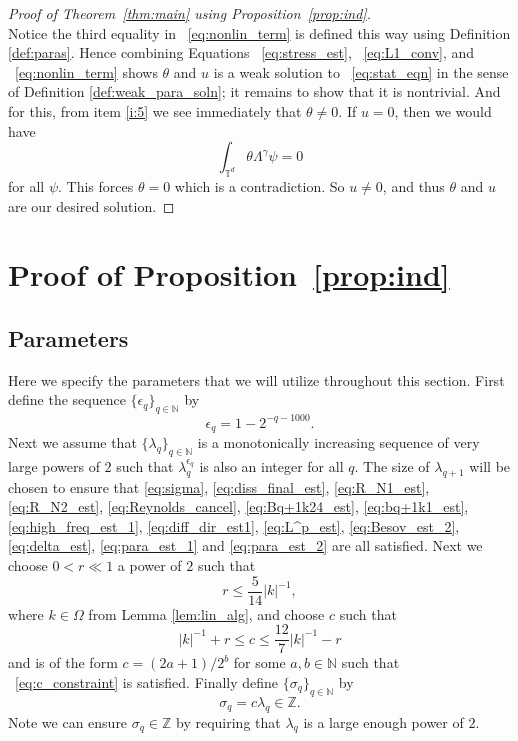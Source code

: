 \documentclass[12pt,reqno,letterpaper]{amsart}
\numberwithin{equation}{section}
\newcommand{\1}{{\bf 1}}
\newcommand{\2}{{\bf 2}}
\newcommand{\N}{\mathbb N}
\newcommand{\T}{\mathbb T}
\newcommand{\Z}{\mathbb Z}
\theoremstyle{remark}
\theoremstyle{remark}
\begin{document}
\begin{proof}[Proof of Theorem~\ref{thm:main} using Proposition~\ref{prop:ind}]
\begin{equation}
\end{equation}
Notice the third equality in ~\eqref{eq:nonlin_term} is defined this way using Definition \ref{def:paras}. Hence combining Equations ~\eqref{eq:stress_est}, ~\eqref{eq:L1_conv}, and ~\eqref{eq:nonlin_term} shows $\theta$ and $u$ is a weak solution to ~\eqref{eq:stat_eqn} in the sense of Definition \ref{def:weak_para_soln}; it remains to show that it is nontrivial. And for this, from item \ref{i:5} we see immediately that $\theta \not =0$. If $u = 0$, then we would have
$$
\int_{\T^d} \theta \Lambda^\gamma \psi = 0
$$
for all $\psi$. This forces $\theta = 0$ which is a contradiction. So $u \not =0$, and thus $\theta$ and $u$ are our desired solution.

\end{proof}












\section{Proof of Proposition~\ref{prop:ind}}\label{Section5}

\subsection{Parameters}\label{sec:param}

Here we specify the parameters that we will utilize throughout this section. First define the sequence $\{\epsilon_q\}_{q \in \N}$ by
$$
\epsilon_q = 1 - 2^{-q-1000}.
$$
Next we assume that $\{\lambda_q\}_{q \in \N}$ is a monotonically increasing sequence of very large powers of $2$ such that $\lambda_q^{\epsilon_q}$ is also an integer for all $q$. The size of $\lambda_{q+1}$ will be chosen to ensure that \eqref{eq:sigma}, \eqref{eq:diss_final_est}, \eqref{eq:R_N1_est}, \eqref{eq:R_N2_est}, \eqref{eq:Reynolds_cancel}, \eqref{eq:Bq+1k24_est}, \eqref{eq:bq+1k1_est}, \eqref{eq:high_freq_est_1}, \eqref{eq:diff_dir_est1}, \eqref{eq:L^p_est}, \eqref{eq:Besov_est_2}, \eqref{eq:delta_est}, \eqref{eq:para_est_1} and \eqref{eq:para_est_2} are all satisfied. Next we choose $0 < r \ll 1$ a power of $2$ such that
\begin{equation}\label{eq:r_constraint}
    r \leq \frac{5}{14}|k|^{-1},
\end{equation}
where $k \in \Omega$ from Lemma \ref{lem:lin_alg}, and choose $c$ such that
\begin{equation}\label{eq:c_constraint}
    |k|^{-1} + r \leq c \leq \frac{12}{7}|k|^{-1} - r
\end{equation}
and is of the form $c = (2a+1)/2^b$ for some $a,b \in \N$ such that ~\eqref{eq:c_constraint} is satisfied. Finally define $\{\sigma_q\}_{q \in \N}$ by
\begin{equation}\label{eq:sigma}
    \sigma_q = c\lambda_q \in \Z.
\end{equation}
Note we can ensure $\sigma_q \in \Z$ by requiring that $\lambda_q$ is a large enough power of $2$.
\end{document}
